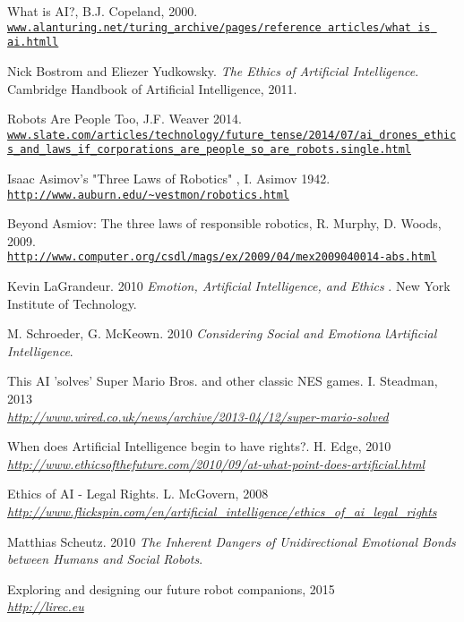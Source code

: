 \documentclass[article]{IEEEtran}
\begin{document}
\begin{thebibliography}{9}

What is AI?, B.J. Copeland, 2000.
\\\texttt{\url{www.alanturing.net/turing_archive/pages/reference articles/what is ai.htmll}}

Nick Bostrom and Eliezer Yudkowsky. 
\textit{The Ethics of Artificial Intelligence}. 
Cambridge Handbook of Artificial Intelligence, 2011.

Robots Are People Too, J.F. Weaver 2014.
\\\texttt{\url{www.slate.com/articles/technology/future_tense/2014/07/ai_drones_ethics_and_laws_if_corporations_are_people_so_are_robots.single.html}}

Isaac Asimov's "Three Laws of Robotics" , I. Asimov 1942.
\\\texttt{\url{http://www.auburn.edu/~vestmon/robotics.html}}

Beyond Asmiov: The three laws of responsible robotics, R. Murphy, D. Woods, 2009.
\\\texttt{\url{http://www.computer.org/csdl/mags/ex/2009/04/mex2009040014-abs.html}}

Kevin LaGrandeur. 2010
\textit{Emotion, Artificial Intelligence, and Ethics }. 
New York Institute of Technology.

M. Schroeder, G. McKeown. 2010
\textit{Considering Social and Emotiona lArtiﬁcial Intelligence}.

This AI 'solves' Super Mario Bros. and other classic NES games. I. Steadman, 2013
\\\textit{\url{ http://www.wired.co.uk/news/archive/2013-04/12/super-mario-solved}}

When does Artificial Intelligence begin to have rights?. H. Edge, 2010
\\\textit{\url{ http://www.ethicsofthefuture.com/2010/09/at-what-point-does-artificial.html}}

Ethics of AI - Legal Rights. L. McGovern, 2008
\\\textit{\url{http://www.flickspin.com/en/artificial_intelligence/ethics_of_ai_legal_rights}}

Matthias Scheutz. 2010
\textit{The Inherent Dangers of Unidirectional Emotional Bonds between Humans and Social Robots}. 

Exploring and designing our future robot companions, 2015
\\\textit{\url{http://lirec.eu}}

\end{thebibliography}
\end{document}
